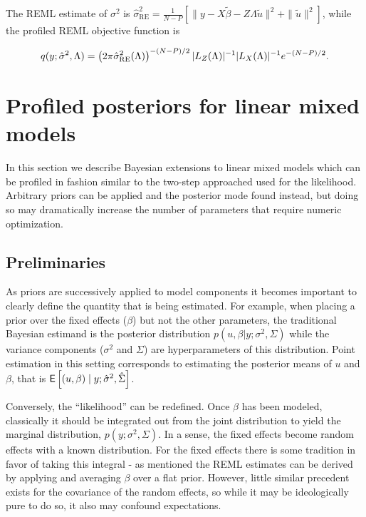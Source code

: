 \documentclass[article,shortnames]{jss}
\begin{document}
\noindent The REML estimate of $\sigma^2$ is $\hat\sigma^2_{\mathrm{RE}} = \frac{1}{N-P}\left[ \|y
  - X \tilde{\beta} - Z \Lambda \tilde{u} \|^2 +
  \|\tilde{u}\|^2\right]$, while the profiled REML objective function is

\begin{equation}
  q(y; \hat{\sigma}^2, \Lambda) = \left(2\pi
    \hat{\sigma}^2_{\rm RE}(\Lambda)\right)^{-(N-P)/2}|L_Z(\Lambda)|^{-1}|L_X(\Lambda)|^{-1}e^{-(N-P)/2}.
\label{eq:remlObjective}
\end{equation}

\section{Profiled posteriors for linear mixed models}

In this section we describe Bayesian extensions to linear mixed models
which can be profiled in fashion similar to the two-step approached
used for the likelihood. Arbitrary
priors can be applied and the posterior mode found instead, but doing
so may dramatically increase the
number of parameters that require numeric optimization.

\subsection{Preliminaries}
\label{sec:bmath:prelim}

As priors are successively applied to model components it becomes
important to clearly define the quantity that is being estimated. For example, when placing
a prior over the fixed effects ($\beta$) but not the other parameters, the
traditional Bayesian estimand is the posterior distribution $p(u, \beta | y; \sigma^2, \Sigma)$
while the variance components ($\sigma^2$ and $\Sigma$) are hyperparameters of this
distribution. Point estimation in this setting
corresponds to estimating the posterior means of $u$ and $\beta$, that is
$\mathsf{E}\left[ (u, \beta) \mid y; \hat{\sigma}^2, \hat\Sigma\right]$.

Conversely, the ``likelihood'' can be redefined. Once $\beta$ has
been modeled, classically it should be integrated out from
the joint distribution to yield the marginal distribution, $p(y; \sigma^2,
\Sigma)$. In a sense, the fixed effects become random effects with a
known distribution. For the fixed effects there is some tradition in
favor of taking this integral - as mentioned the REML
estimates can be derived by applying and averaging $\beta$ over a flat
prior. However, little similar precedent exists for the covariance of
the random effects, so while it may be ideologically pure to do so, it
also may confound expectations.
\end{document}

